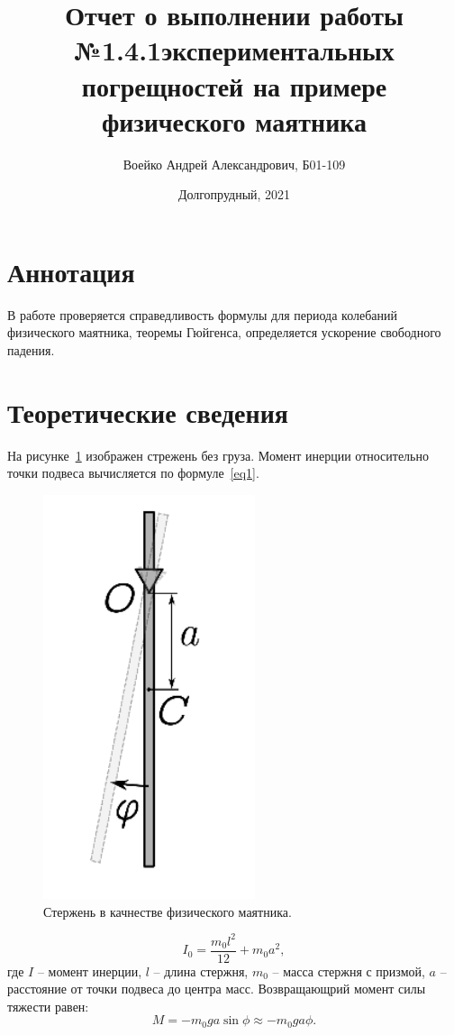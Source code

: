 \documentclass[a4paper,11pt]{article}
\title{Отчет о выполнении работы №1.4.1\newlineИзучение экспериментальных погрещностей на примере физического маятника}
\author{Воейко Андрей Александрович, Б01-109}
\date{Долгопрудный, 2021}
\begin{document}
\maketitle
\newpage
\section{Аннотация}
В работе проверяется справедливость формулы для периода колебаний физического маятника, теоремы Гюйгенса, определяется ускорение свободного падения.
\section{Теоретические сведения}
На рисунке~\ref{fig:img1} изображен стрежень без груза. Момент инерции относительно точки подвеса вычисляется по формуле~\ref{eq1}.
\begin{figure}
  \includegraphics[scale = 0.5]{pic1.png}
  \caption{Стержень в качнестве физического маятника.}
  \label{fig:img1}
\end{figure}
\begin{equation}    \label{eq1}
  I_{0} = \frac{m_{0}l^{2}}{12} + m_{0}a^{2},
\end{equation}
где $I$ -- момент инерции, $l$ -- длина стержня, $m_{0}$ -- масса стержня с призмой, $a$ -- расстояние от точки подвеса до центра масс.\newline
Возвращающрий момент силы тяжести равен:
\begin{equation}    \label{eq2}
  M = -m_{0}g a \sin{\phi} \approx -m_{0}g a \phi.
\end{equation}
\end{document}
